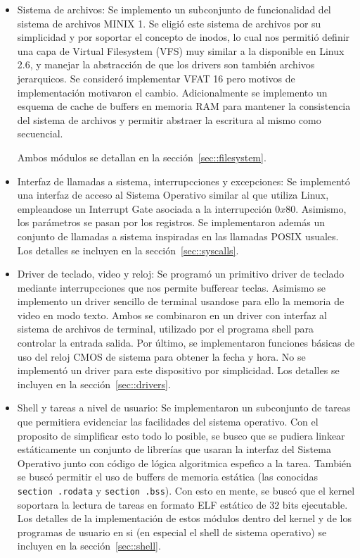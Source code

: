 \begin{itemize}
	\item Sistema de archivos: Se implemento un subconjunto de funcionalidad del sistema de archivos MINIX 1.
	Se eligi\'o este sistema de archivos por su simplicidad y por soportar el concepto de inodos, lo cual nos
	permiti\'o definir una capa de Virtual Filesystem (VFS) muy similar a la disponible en Linux 2.6, y manejar
	la abstracci\'on de que los drivers son tambi\'en archivos jerarquicos. Se consider\'o implementar VFAT 16
	pero motivos de implementaci\'on motivaron el cambio. 
	Adicionalmente se implemento un esquema de cache de buffers en memoria RAM para mantener la consistencia del
	sistema de archivos y permitir abstraer la escritura al mismo como secuencial.

	Ambos m\'odulos se detallan en la secci\'on~\ref{sec::filesystem}.
	\item Interfaz de llamadas a sistema, interrupcciones y excepciones: Se implement\'o una interfaz de acceso
	al Sistema Operativo similar al que utiliza Linux, empleandose un Interrupt Gate asociada a la interrupcci\'on
	$0x80$. Asimismo, los par\'ametros se pasan por los registros. Se implementaron adem\'as un conjunto de llamadas
	a sistema inspiradas en las llamadas POSIX usuales. Los detalles se incluyen en la secci\'on~\ref{sec::syscalls}.

	\item Driver de teclado, video y reloj: Se program\'o un primitivo driver de teclado mediante interrupcciones que
	nos permite bufferear teclas. Asimismo se implemento un driver sencillo de terminal usandose para ello la memoria
	de video en modo texto. Ambos se combinaron en un driver con interfaz al sistema de archivos de terminal, utilizado
	por el programa shell para controlar la entrada salida. Por \'ultimo, se implementaron funciones b\'asicas de uso
	del reloj CMOS de sistema para obtener la fecha y hora. No se implement\'o un driver para este dispositivo por simplicidad.
	Los detalles se incluyen en la secci\'on~\ref{sec::drivers}.

	\item Shell y tareas a nivel de usuario: Se implementaron un subconjunto de tareas que permitiera evidenciar las facilidades
	del sistema operativo. Con el proposito de simplificar esto todo lo posible, se busco que se pudiera linkear est\'aticamente
	un conjunto de librer\'ias que usaran la interfaz del Sistema Operativo junto con c\'odigo de l\'ogica algoritmica espefico a la
	tarea. Tambi\'en se busc\'o permitir el uso de buffers de memoria est\'atica (las conocidas 
	\texttt{section .rodata} y \texttt{section .bss}). Con esto en mente, se busc\'o que el kernel soportara la lectura de tareas en
	formato ELF est\'atico de 32 bits ejecutable. Los detalles de la implementaci\'on de estos m\'odulos dentro del kernel y de los
	programas de usuario en si (en especial el shell de sistema operativo) se incluyen en la secci\'on~\ref{sec::shell}.

\end{itemize}
